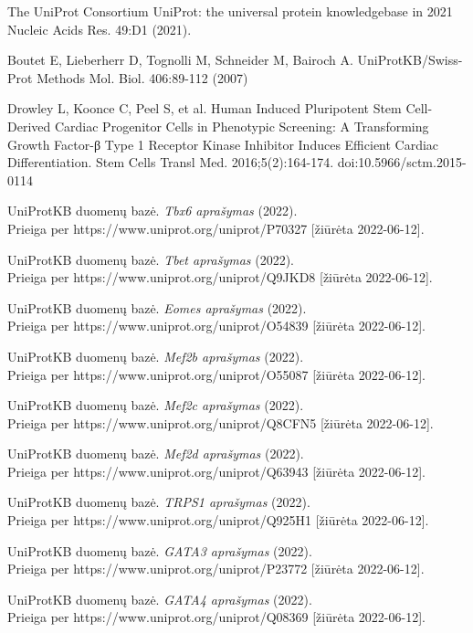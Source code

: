 \documentclass[12pt]{article}
\begin{document}
\begin{thebibliography}{99}
 The UniProt Consortium UniProt: the universal protein
knowledgebase in 2021 Nucleic Acids Res. 49:D1 (2021).

 Boutet E, Lieberherr D, Tognolli M, Schneider M, Bairoch A.
UniProtKB/Swiss-Prot Methods Mol. Biol. 406:89-112 (2007)

 Drowley L, Koonce C, Peel S, et al. Human
Induced Pluripotent Stem Cell-Derived Cardiac Progenitor Cells in Phenotypic
Screening: A Transforming Growth Factor-β Type 1 Receptor Kinase Inhibitor
Induces Efficient Cardiac Differentiation. Stem Cells Transl Med.
2016;5(2):164-174. doi:10.5966/sctm.2015-0114

 UniProtKB duomenų bazė. \emph{Tbx6 aprašymas} (2022).\\
Prieiga per https://www.uniprot.org/uniprot/P70327 [žiūrėta 2022-06-12].

 UniProtKB duomenų bazė. \emph{Tbet aprašymas} (2022).\\
Prieiga per https://www.uniprot.org/uniprot/Q9JKD8 [žiūrėta 2022-06-12].

 UniProtKB duomenų bazė. \emph{Eomes aprašymas} (2022).\\
Prieiga per https://www.uniprot.org/uniprot/O54839 [žiūrėta 2022-06-12].

 UniProtKB duomenų bazė. \emph{Mef2b aprašymas} (2022).\\
Prieiga per https://www.uniprot.org/uniprot/O55087 [žiūrėta 2022-06-12].

 UniProtKB duomenų bazė. \emph{Mef2c aprašymas} (2022).\\
Prieiga per https://www.uniprot.org/uniprot/Q8CFN5 [žiūrėta 2022-06-12].

 UniProtKB duomenų bazė. \emph{Mef2d aprašymas} (2022).\\
Prieiga per https://www.uniprot.org/uniprot/Q63943 [žiūrėta 2022-06-12].

 UniProtKB duomenų bazė. \emph{TRPS1 aprašymas} (2022).\\
Prieiga per https://www.uniprot.org/uniprot/Q925H1 [žiūrėta 2022-06-12].

 UniProtKB duomenų bazė. \emph{GATA3 aprašymas} (2022).\\
Prieiga per https://www.uniprot.org/uniprot/P23772 [žiūrėta 2022-06-12].

 UniProtKB duomenų bazė. \emph{GATA4 aprašymas} (2022).\\
Prieiga per https://www.uniprot.org/uniprot/Q08369 [žiūrėta 2022-06-12].


\end{thebibliography}
\end{document}
